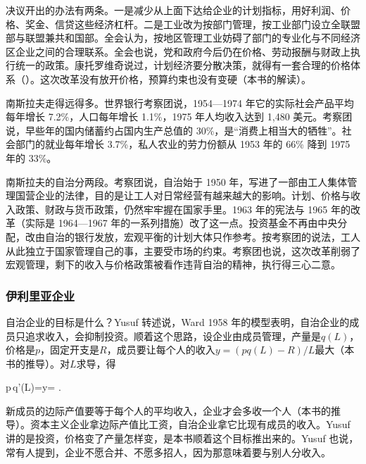 决议开出的办法有两条。一是减少从上面下达给企业的计划指标，用好利润、价格、奖金、信贷这些经济杠杆\cite{zv1965}。二是工业改为按部门管理，按工业部门设立全联盟部与联盟兼共和国部\cite{zv1965}。全会认为，按地区管理工业妨碍了部门的专业化与不同经济区企业之间的合理联系\cite{zv1965}。全会也说，党和政府今后仍在价格、劳动报酬与财政上执行统一的政策\cite{zv1965}。康托罗维奇说过，计划经济要分散决策，就得有一套合理的价格体系（）。这次改革没有放开价格，预算约束也没有变硬（本书的解读）。

南斯拉夫走得远得多。世界银行考察团说，1954—1974 年它的实际社会产品平均每年增长 7.2\%，人口每年增长 1.1\%，1975 年人均收入达到 1,480 美元\cite{worldbank1978yu}。考察团说，早些年的国内储蓄约占国内生产总值的 30\%，是“消费上相当大的牺牲”\cite{worldbank1978yu}。社会部门的就业每年增长 3.7\%，私人农业的劳力份额从 1953 年的 66\% 降到 1975 年的 33\%\cite{worldbank1978yu}。

南斯拉夫的自治分两段。考察团说，自治始于 1950 年，写进了一部由工人集体管理国营企业的法律，目的是让工人对日常经营有越来越大的影响\cite{worldbank1978yu}。计划、价格与收入政策、财政与货币政策，仍然牢牢握在国家手里\cite{worldbank1978yu}。1963 年的宪法与 1965 年的改革（实际是 1964—1967 年的一系列措施）改了这一点\cite{worldbank1978yu}。投资基金不再由中央分配，改由自治的银行发放，宏观平衡的计划大体只作参考\cite{worldbank1978yu}。按考察团的说法，工人从此独立于国家管理自己的事，主要受市场的约束\cite{worldbank1978yu}。考察团也说，这次改革削弱了宏观管理，剩下的收入与价格政策被看作违背自治的精神，执行得三心二意\cite{worldbank1978yu}。

\subsubsection{伊利里亚企业}

自治企业的目标是什么？Yusuf 转述说，Ward 1958 年的模型表明，自治企业的成员只追求收入，会抑制投资\cite{yusuf1977}。顺着这个思路，设企业由成员管理，产量是$q(L)$，价格是$p$，固定开支是$R$，成员要让每个人的收入$y=(pq(L)-R)/L$最大（本书的推导）。对$L$求导，得
\begin{keyeq}
p\,q'(L)=y= .\label{eq:planned-illyria}
\end{keyeq}
新成员的边际产值要等于每个人的平均收入，企业才会多收一个人（本书的推导）。资本主义企业拿边际产值比工资，自治企业拿它比现有成员的收入。Yusuf 讲的是投资，价格变了产量怎样变，是本书顺着这个目标推出来的。Yusuf 也说，常有人提到，企业不愿合并、不愿多招人，因为那意味着要与别人分收入\cite{yusuf1977}。

